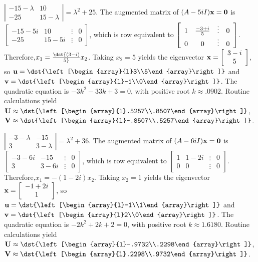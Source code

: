 \documentclass[dvips]{book}
\renewcommand{\exer}[1]{\par\medskip\;\noindent{\color{red}\bf #1.}}
\numberwithin{example}{section}
\numberwithin{equation}{section}
\numberwithin{theorem}{section}
\numberwithin{table}{section}
\numberwithin{figure}{section}
\newcommand{\twocol}[2]{\left[\begin{array}{l}#1\\#2\end{array}\right]}
\begin{document}
\exer{10.6.30}
$\left|\begin{array}{cc}-15-\lambda&10\\-25&15-\lambda
\end{array}\right|=\lambda^2+25$.
The augmented matrix of $(A-5iI){\bf x}={\bf 0}$ is
$\left[\begin{array}{cccr}-15-5i&10&\vdots&0\\
-25&15-5i&\vdots&0 \end{array}\right]$,
which is row equivalent to
$\left[\begin{array}{cccr} 1&{-3+i\over5}&\vdots&0\\ 0&0&\vdots&0
\end{array}\right]$.
Therefore,$x_1=\dst{(3-i)\over5}x_2$. Taking $x_2=5$
yields the eigenvector
 ${\bf x}=\left[\begin{array}{c}3-i\\5\end{array}\right]$,
so ${\bf u}=\dst{\twocol35}$ and ${\bf v}=\dst{\twocol{-1}0}$.
The quadratic equation is $-3k^2-33k+3=0$, with positive root
$k\approx.0902$.
 Routine calculations yield
 ${\bf U}\approx\dst{\twocol{.5257}{.8507}}$,
${\bf V}\approx\dst{\twocol{-.8507}{.5257}}$.


\exer{10.6.32}
$\left|\begin{array}{cc}-3-\lambda&-15\\3&3-\lambda
\end{array}\right|=\lambda^2+36$.
The augmented matrix of $(A-6iI){\bf x}={\bf 0}$ is
$\left[\begin{array}{cccr}-3-6i&-15&\vdots&0\\
3&3-6i&\vdots&0 \end{array}\right]$,
which is row equivalent to
$\left[\begin{array}{cccr} 1&1-2i&\vdots&0\\ 0&0&\vdots&0
\end{array}\right]$.
Therefore,$x_1=-(1-2i)x_2$. Taking $x_2=1$
yields the eigenvector
 ${\bf x}=\left[\begin{array}{c}-1+2i\\1\end{array}\right]$,
so ${\bf u}=\dst{\twocol{-1}1}$ and ${\bf v}=\dst{\twocol20}$.
The quadratic equation is $-2k^2+2k+2=0$, with positive root
$k\approx1.6180$.
 Routine calculations yield
 ${\bf U}\approx\dst{\twocol{-.9732}{.2298}}$,
${\bf V}\approx\dst{\twocol{.2298}{.9732}}$.
\end{document}
